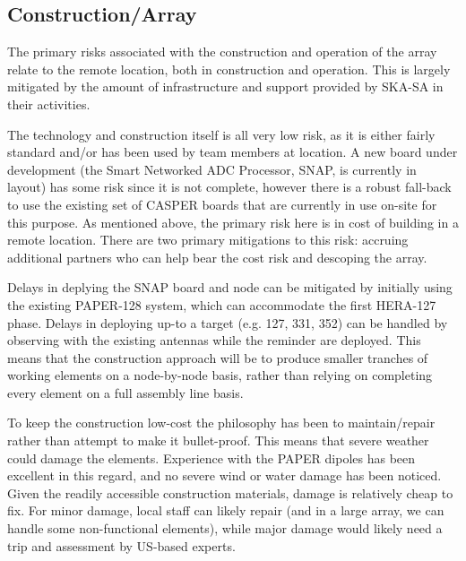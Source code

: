 \documentclass[preprint]{aastex}
\begin{document}
\subsection{Construction/Array}
The primary risks associated with the construction and operation of the array relate
to the remote location, both in construction and operation. This is largely mitigated
by the amount of infrastructure and support provided by SKA-SA in their activities.

The technology and construction itself is all very low risk, as it is either fairly standard and/or
has been used by team members at location.  A new board under development (the Smart Networked
ADC Processor, SNAP, is currently in layout) has some risk since it is not complete, however there
is a robust fall-back to use the existing set of CASPER boards that are currently in use on-site for this
purpose.  As mentioned above, the primary risk here is in cost of building in a remote location.
There are two primary mitigations to this risk:  accruing additional partners who can help bear
the cost risk and descoping the array.

Delays in deplying the SNAP board and node can be 
mitigated by initially using the existing PAPER-128 system, which can accommodate the first 
HERA-127 phase.  Delays in deploying up-to a target (e.g. 127, 331, 352) can be handled by
observing with the existing antennas while the reminder are deployed.  This means that the
construction approach will be to produce smaller tranches of working elements on a node-by-node
basis, rather than relying on completing every element on a full assembly line basis.

To keep the construction low-cost the philosophy has been to maintain/repair rather
than attempt to make it bullet-proof. This means that severe weather could damage the
elements. Experience with the PAPER dipoles has been excellent in this regard, and no
severe wind or water damage has been noticed. Given the readily accessible
construction materials, damage is relatively cheap to fix. For minor damage, local
staff can likely repair (and in a large array, we can handle some non-functional
elements), while major damage would likely need a trip and assessment by US-based
experts.
\end{document}
